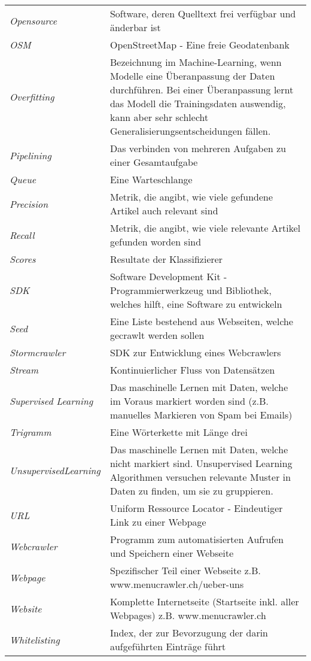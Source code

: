 \begin{table}[H]
\begin{tabular}{>{\em}p{4cm}p{12cm}}
	\end{tabular}
\end{table}
\begin{table}[H]
	\begin{tabular}{>{\em}p{4cm}p{12cm}}
		Opensource & Software, deren Quelltext frei verfügbar und änderbar ist\\
		OSM & OpenStreetMap - Eine freie Geodatenbank\\
		Overfitting & Bezeichnung im Machine-Learning, wenn Modelle eine Überanpassung der Daten durchführen. Bei einer Überanpassung lernt das Modell die Trainingsdaten auswendig, kann aber sehr schlecht Generalisierungsentscheidungen fällen.\\
		Pipelining & Das verbinden von mehreren Aufgaben zu einer Gesamtaufgabe\\
		Queue & Eine Warteschlange\\
		Precision & Metrik, die angibt, wie viele gefundene Artikel auch relevant sind\\
		Recall & Metrik, die angibt, wie viele relevante Artikel gefunden worden sind\\
		Scores & Resultate der Klassifizierer\\
		SDK & Software Development Kit - Programmierwerkzeug und Bibliothek, welches hilft, eine Software zu entwickeln\\
		Seed & Eine Liste bestehend aus Webseiten, welche gecrawlt werden sollen\\
		Stormcrawler & SDK zur Entwicklung eines Webcrawlers\\
		Stream & Kontinuierlicher Fluss von Datensätzen\\
		Supervised Learning & Das maschinelle Lernen mit Daten, welche im Voraus markiert worden sind (z.B. manuelles Markieren von Spam bei Emails)\\
		Trigramm & Eine Wörterkette mit Länge drei\\
		Unsupervised\newline Learning & Das maschinelle Lernen mit Daten, welche nicht markiert sind. Unsupervised Learning Algorithmen versuchen relevante Muster in Daten zu finden, um sie zu gruppieren.\\
		URL & Uniform Ressource Locator - Eindeutiger Link zu einer Webpage\\
		Webcrawler & Programm zum automatisierten Aufrufen und Speichern einer Webseite\\
		Webpage & Spezifischer Teil einer Webseite z.B. www.menucrawler.ch/ueber-uns\\
		Website & Komplette Internetseite (Startseite inkl. aller Webpages) z.B. www.menucrawler.ch\\
		Whitelisting & Index, der zur Bevorzugung der darin aufgeführten Einträge führt\\	
	\end{tabular}
\end{table}
